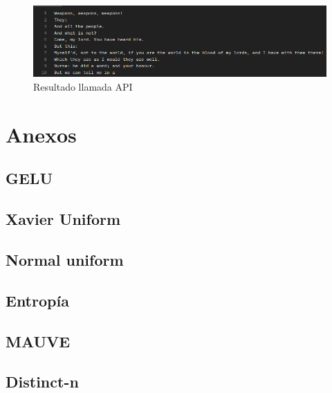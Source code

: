 \documentclass[11pt]{book}
\newcommand{\clearemptydoublepage}{\newpage{\pagestyle{empty}\cleardoublepage}}
\theoremstyle{plain}
\theoremstyle{definition}
\begin{document}
\begin{figure}[h]
    \centering
    \includegraphics[width=0.5\linewidth]{img/api_res.png}
    \caption{Resultado llamada API}
    \label{fig:placeholder28}
\end{figure}

\clearemptydoublepage

\printbibliography[title={Referencias Bibliográficas}]

\appendix 
\chapter{Anexos}

\section{GELU} \label{sec:gelu}
\section{Xavier Uniform} \label{sec:xavier}
\section{Normal uniform} \label{sec:normal}

\section{Entropía} \label{sec:entropia}

\section{MAUVE} \label{sec:mauve}


\section{Distinct-n} \label{sec:distinct-n}


\clearemptydoublepage
\end{document}
